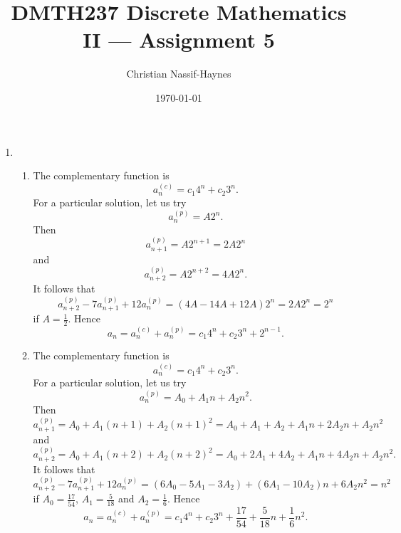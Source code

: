 \documentclass[a4paper]{article}
\begin{document}
	\title{DMTH237 Discrete Mathematics II --- Assignment 5}
	\author{Christian Nassif-Haynes}
	\date{\today}
	\maketitle
		
	\begin{enumerate}
		\item
		\begin{enumerate}
			\item The complementary function is
			\begin{equation*}
				a_n^{(c)} = c_1 4^n + c_2 3^n.
			\end{equation*}
			For a particular solution, let us try
			\begin{equation*}
				a_n^{(p)} = A2^n.
			\end{equation*}
			Then
			\begin{equation*}
				a_{n+1}^{(p)} = A2^{n+1} = 2A2^n
			\end{equation*}
			and
			\begin{equation*}
				a_{n+2}^{(p)} = A2^{n+2} = 4A2^n.
			\end{equation*}
			It follows that
			\begin{equation*}
				a_{n+2}^{(p)} - 7a_{n+1}^{(p)} + 12a_{n}^{(p)} = (4A - 14A + 12A) 2^n = 2 A 2^n = 2^n
			\end{equation*}
			if $A = \frac{1}{2}$. Hence
			\begin{equation*}
				a_n = a_n^{(c)} + a_n^{(p)} = c_1 4^n + c_2 3^n + 2^{n-1}.
			\end{equation*}
			
			\item The complementary function is
			\begin{equation*}
				a_n^{(c)} = c_1 4^n + c_2 3^n.
			\end{equation*}
			For a particular solution, let us try
			\begin{equation*}
				a_n^{(p)} = A_0 + A_1 n + A_2 n^2.
			\end{equation*}
			Then
			\begin{equation*}
				a_{n+1}^{(p)} = A_0 + A_1 (n+1) + A_2 (n+1)^2 = A_0 + A_1 + A_2 + A_1 n + 2 A_2 n + A_2 n^2
			\end{equation*}
			and
			\begin{equation*}
				a_{n+2}^{(p)} = A_0 + A_1 (n+2) + A_2 (n+2)^2 = A_0 + 2 A_1 + 4 A_2 + A_1 n + 4 A_2 n + A_2 n^2.
			\end{equation*}
			It follows that
			\begin{equation*}
				a_{n+2}^{(p)} - 7a_{n+1}^{(p)} + 12a_{n}^{(p)} = (6 A_0 - 5 A_1 - 3 A_2) + (6 A_1 - 10 A_2) n + 6 A_2 n^2 = n^2
			\end{equation*}
			if $A_0 = \frac{17}{54}$, $A_1 = \frac{5}{18}$ and $A_2 = \frac{1}{6}$. Hence
			\begin{equation*}
				a_n = a_n^{(c)} + a_n^{(p)} = c_1 4^n + c_2 3^n + \frac{17}{54} + \frac{5}{18} n + \frac{1}{6} n^2.
			\end{equation*}
			

\end{enumerate}
\end{enumerate}
\end{document}
